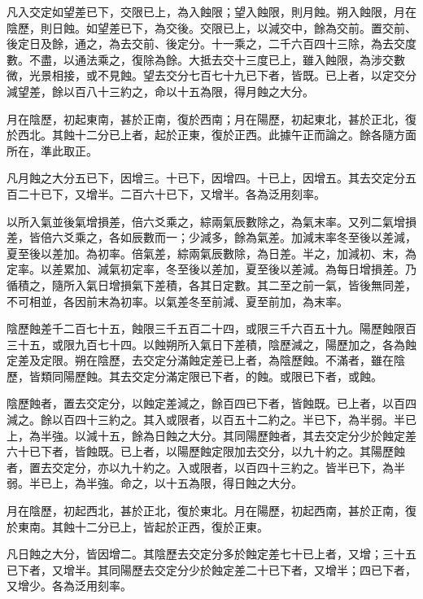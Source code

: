 \begin{pinyinscope}
 凡入交定如望差已下，交限已上，為入蝕限；望入蝕限，則月蝕。朔入蝕限，月在陰歷，則日蝕。如望差已下，為交後。交限已上，以減交中，餘為交前。置交前、後定日及餘，通之，為去交前、後定分。十一乘之，二千六百四十三除，為去交度數。不盡，以通法乘之，復除為餘。大抵去交十三度已上，雖入蝕限，為涉交數微，光景相接，或不見蝕。望去交分七百七十九已下者，皆既。已上者，以定交分減望差，餘以百八十三約之，命以十五為限，得月蝕之大分。



 月在陰歷，初起東南，甚於正南，復於西南；月在陽歷，初起東北，甚於正北，復於西北。其蝕十二分已上者，起於正東，復於正西。此據午正而論之。餘各隨方面所在，準此取正。



 凡月蝕之大分五已下，因增三。十已下，因增四。十已上，因增五。其去交定分五百二十已下，又增半。二百六十已下，又增半。各為泛用刻率。



 以所入氣並後氣增損差，倍六爻乘之，綜兩氣辰數除之，為氣末率。又列二氣增損差，皆倍六爻乘之，各如辰數而一；少減多，餘為氣差。加減末率冬至後以差減，夏至後以差加。為初率。倍氣差，綜兩氣辰數除，為日差。半之，加減初、末，為定率。以差累加、減氣初定率，冬至後以差加，夏至後以差減。為每日增損差。乃循積之，隨所入氣日增損氣下差積，各其日定數。其二至之前一氣，皆後無同差，不可相並，各因前末為初率。以氣差冬至前減、夏至前加，為末率。



 陰歷蝕差千二百七十五，蝕限三千五百二十四，或限三千六百五十九。陽歷蝕限百三十五，或限九百七十四。以蝕朔所入氣日下差積，陰歷減之，陽歷加之，各為蝕定差及定限。朔在陰歷，去交定分滿蝕定差已上者，為陰歷蝕。不滿者，雖在陰歷，皆類同陽歷蝕。其去交定分滿定限已下者，的蝕。或限已下者，或蝕。



 陰歷蝕者，置去交定分，以蝕定差減之，餘百四已下者，皆蝕既。已上者，以百四減之。餘以百四十三約之。其入或限者，以百五十二約之。半已下，為半弱。半已上，為半強。以減十五，餘為日蝕之大分。其同陽歷蝕者，其去交定分少於蝕定差六十已下者，皆蝕既。已上者，以陽歷蝕定限加去交分，以九十約之。其陽歷蝕者，置去交定分，亦以九十約之。入或限者，以百四十三約之。皆半已下，為半弱。半已上，為半強。命之，以十五為限，得日蝕之大分。



 月在陰歷，初起西北，甚於正北，復於東北。月在陽歷，初起西南，甚於正南，復於東南。其蝕十二分已上，皆起於正西，復於正東。



 凡日蝕之大分，皆因增二。其陰歷去交定分多於蝕定差七十已上者，又增；三十五已下者，又增半。其同陽歷去交定分少於蝕定差二十已下者，又增半；四已下者，又增少。各為泛用刻率。




\end{pinyinscope}
